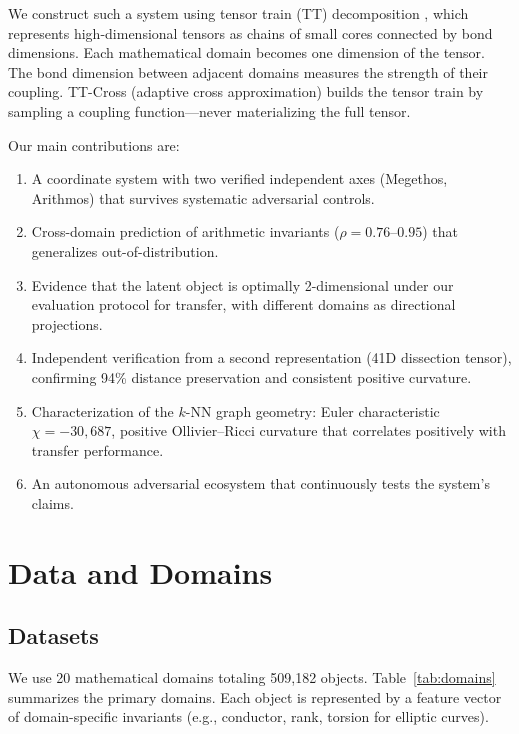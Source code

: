 \documentclass[11pt,a4paper]{article}
\begin{document}
We construct such a system using tensor train (TT) decomposition \cite{oseledets2011}, which represents high-dimensional tensors as chains of small cores connected by bond dimensions. Each mathematical domain becomes one dimension of the tensor. The bond dimension between adjacent domains measures the strength of their coupling. TT-Cross (adaptive cross approximation) builds the tensor train by sampling a coupling function---never materializing the full tensor.

Our main contributions are:
\begin{enumerate}[nosep]
    \item A coordinate system with two verified independent axes (Megethos, Arithmos) that survives systematic adversarial controls.
    \item Cross-domain prediction of arithmetic invariants ($\rho = 0.76$--$0.95$) that generalizes out-of-distribution.
    \item Evidence that the latent object is optimally 2-dimensional under our evaluation protocol for transfer, with different domains as directional projections.
    \item Independent verification from a second representation (41D dissection tensor), confirming 94\% distance preservation and consistent positive curvature.
    \item Characterization of the $k$-NN graph geometry: Euler characteristic $\chi = -30{,}687$, positive Ollivier--Ricci curvature that correlates positively with transfer performance.
    \item An autonomous adversarial ecosystem that continuously tests the system's claims.
\end{enumerate}

\section{Data and Domains}

\subsection{Datasets}

We use 20 mathematical domains totaling 509,182 objects. Table~\ref{tab:domains} summarizes the primary domains. Each object is represented by a feature vector of domain-specific invariants (e.g., conductor, rank, torsion for elliptic curves).
\end{document}
